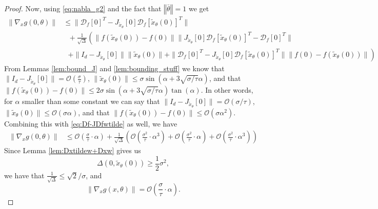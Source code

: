 \documentclass[12pt]{article}
\theoremstyle{remark}
\newcommand{\DD}{\mathcal{D}}
\newcommand{\OO}{\mathcal{O}}
\newcommand{\norm}[1]{\left\Vert #1 \right\Vert}
\newcommand{\wtilde}[1]{\widetilde{#1}}
\begin{document}
\begin{appendices}
\begin{proof}
Now, using \eqref{eq:nabla_g2} and the fact that $\norm{\bar \theta} = 1$ we get
\begin{align*}
    \|\nabla_x{g}(0,\theta)\|  &\leq\|\DD_f[0]^T - J_{\wtilde{x}_\theta}[0] \DD_f[\wtilde{x}_\theta(0)]^T\|  \\\
    &~~~
    +
    \frac{1}{\sqrt{\Delta}}
    \left( 
     \|f(\wtilde{x}_\theta(0)) - f(0)\| \|J_{\wtilde{x}_\theta}[0]\DD_f[\wtilde{x}_\theta(0)]^T - \DD_f[0]^T \| 
    \right. \\
    &~~~ \left.+ 
    \|I_d-J_{\wtilde{x}_\theta}[0]\|\|\wtilde{x}_\theta(0)\| 
    + 
    \|\DD_f[0]^T - J_{\wtilde{x}_\theta}[0]\DD_f[\wtilde{x}_\theta(0)]^T\|\|f(0)- f(\wtilde{x}_\theta(0))\|\right)
\end{align*}
From Lemmas \ref{lem:bound_J} and \ref{lem:bounding_stuff} we know that $\|I_d - J_{\wtilde x_\theta}[0]\| =\OO(\frac{\sigma}{\tau})$, $\|\wtilde x_\theta(0)\|\leq \sigma \sin(\alpha + 3\sqrt{\sigma/\tau} \alpha)$, and that $\|f(\wtilde x_\theta(0)) - f(0)\| \leq 2\sigma \sin(\alpha + 3\sqrt{\sigma/\tau}\alpha)\tan(\alpha)$.
In other words, for $\alpha$ smaller than some constant we can say that $\|I_d - J_{\wtilde x_\theta}[0]\| = \OO(\sigma/\tau)$, $\|\wtilde x_\theta(0)\|\leq \OO(\sigma \alpha)$, and that $\|f(\wtilde x_\theta(0)) - f(0)\| \leq \OO(\sigma \alpha^2)$.
Combining this with \eqref{eq:Df-JDfwtilde} as well, we have
\begin{align*}
    \|\nabla_x{g}(0,\theta)\| &\leq\OO(\frac{\sigma}{\tau}\cdot\alpha)
    +
    \frac{1}{\sqrt{\Delta}}
    \left( 
    \OO(\frac{\sigma^2}{\tau}\cdot\alpha^3)
    + 
    \OO(\frac{\sigma^2}{\tau}\cdot\alpha) 
    +
    \OO(\frac{\sigma^2}{\tau}\cdot\alpha^3)\right)
\end{align*}
Since Lemma \ref{lem:Dxtildew+Dxw} gives us 
\[
 \Delta(0,\wtilde x_\theta (0)) \geq \frac{1}{2} \sigma^2
,\]
we have that $\frac{1}{\sqrt{\Delta}}\leq \sqrt{2}/\sigma$, and 
\begin{equation*}
    \|\nabla_x{g}(x,\theta)\| =  \OO(\frac{\sigma}{\tau}\cdot\alpha)
.\end{equation*}
\end{proof}


\end{appendices}
\end{document}
